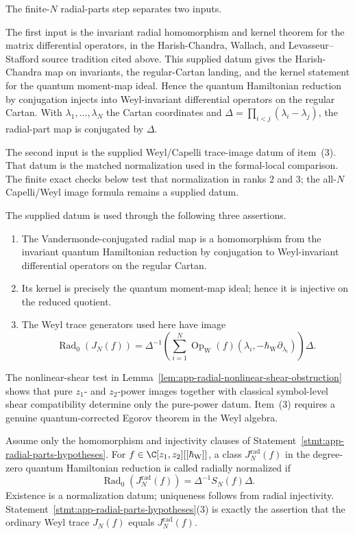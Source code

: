 \begin{stmt}
\label{stmt:app-radial-parts-hypotheses}
  The finite-\(N\) radial-parts step separates two inputs.

  The first input is the invariant radial homomorphism and kernel
  theorem for the matrix differential operators, in the Harish-Chandra,
  Wallach, and Levasseur--Stafford source tradition cited above.  This
  supplied datum gives the
  Harish-Chandra map on invariants, the regular-Cartan landing, and the
  kernel statement for the quantum moment-map ideal.  Hence the quantum
  Hamiltonian reduction by conjugation injects into Weyl-invariant
  differential operators on the regular Cartan.  With
  \(\lambda_1,\ldots,\lambda_N\) the Cartan coordinates and
  \(\Delta=\prod_{i<j}(\lambda_i-\lambda_j)\), the radial-part map is
  conjugated by \(\Delta\).

  The second input is the supplied Weyl/Capelli trace-image datum of
  item~(3).  That datum is the matched normalization used in the
  formal-local comparison.
  The finite exact checks below test that normalization in ranks \(2\)
  and \(3\); the all-\(N\) Capelli/Weyl image formula remains a supplied
  datum.

  The supplied datum is used through the following three assertions.
  \begin{enumerate}
    \item The Vandermonde-conjugated radial map is a homomorphism from
      the invariant quantum Hamiltonian reduction by conjugation to
      Weyl-invariant differential operators on the regular Cartan.
    \item Its kernel is precisely the quantum moment-map ideal; hence it
      is injective on the reduced quotient.
    \item The Weyl trace generators used here have image
  \[
    \operatorname{Rad}_0(J_N(f))
      =\Delta^{-1}\left(\sum_{i=1}^N
        \operatorname{Op}_{\mathrm W}
        (f)(\lambda_i,-\hbar_{\mathrm{W}}\partial_{\lambda_i})\right)\Delta.
  \]
  \end{enumerate}
  The nonlinear-shear test in
  Lemma~\ref{lem:app-radial-nonlinear-shear-obstruction} shows that
  pure \(z_1\)- and \(z_2\)-power images together with classical
  symbol-level shear compatibility determine only the pure-power datum.
  Item~(3) requires a genuine quantum-corrected Egorov theorem in the
  Weyl algebra.
\end{stmt}

\begin{defn}
Assume only the homomorphism and injectivity clauses of
Statement~\ref{stmt:app-radial-parts-hypotheses}.  For
\(f\in\C[z_1,z_2][[\hbar_{\mathrm{W}}]]\), a class \(J_N^{\mathrm{rad}}(f)\) in the
degree-zero quantum Hamiltonian reduction is called radially normalized
if
\[
  \operatorname{Rad}_0(J_N^{\mathrm{rad}}(f))
  =\Delta^{-1}S_N(f)\Delta .
\]
Existence is a normalization datum; uniqueness follows from radial
injectivity.  Statement~\ref{stmt:app-radial-parts-hypotheses}(3) is
exactly the assertion that the ordinary Weyl trace \(J_N(f)\) equals
\(J_N^{\mathrm{rad}}(f)\).
\end{defn}

